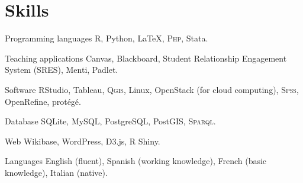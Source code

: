 \documentclass[11pt,a4paper,sans]{moderncv}
\begin{document}
\section{Skills}

  \cvline
    {Programming languages} %
    {\textsc{R}, Python, LaTeX, \textsc{Php},  Stata.} 

  \cvline
    {Teaching applications} %
    {Canvas, Blackboard, Student Relationship Engagement System (SRES), Menti, Padlet.} 

  \cvline
    {Software} %
    {RStudio, Tableau, \textsc{Qgis}, Linux, OpenStack (for cloud computing), \textsc{Spss}, OpenRefine, protégé.} 

  \cvline
    {Database} %
    {SQLite, MySQL, PostgreSQL, PostGIS, \textsc{Sparql}.} %

  \cvline
    {Web} %
    {Wikibase, WordPress, D3.js, R Shiny.} %

  \cvline
    {Languages} %
    {English (fluent), Spanish (working knowledge), French (basic knowledge), Italian (native).} %
\end{document}
